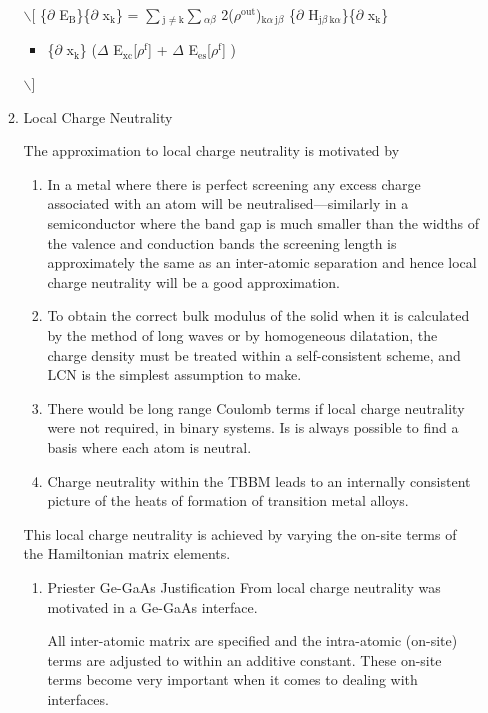 \documentclass[11pt]{article}
\begin{document}
\begin{enumerate}
\begin{enumerate}
$\backslash$[
\frac\{$\partial$ E$_{\text{B}}$\}\{$\partial$ x$_{\text{k}}$\} = 
   $\sum$$_{\text{j }\neq\ \text{k}}$$\sum$$_{\alpha\beta}$ 2($\rho$$^{\text{out}}$)$_{\text{k}\alpha\ \text{j}\beta}$
       \frac\{$\partial$ H$_{\text{j}\beta\ \text{k}\alpha}$\}\{$\partial$ x$_{\text{k}}$\}
\begin{itemize}
\item \frac{\partial}\{$\partial$ x$_{\text{k}}$\} \big($\Delta$ E$_{\text{xc}}$[$\rho$$^{\text{f}}$] + $\Delta$ E$_{\text{es}}$[$\rho$$^{\text{f}}$] \big )
\end{itemize}
$\backslash$]

\item Local Charge Neutrality
\label{sec-1-1-2-2-3}

The approximation to local charge neutrality is motivated by 
\begin{enumerate}
\item In a metal where there is perfect screening any excess charge associated
with an atom will be neutralised---similarly in a semiconductor where the
band gap is much smaller than the widths of the valence and conduction
bands the screening length is approximately the same as an inter-atomic
separation and hence local charge neutrality will be a good
approximation.
\item To obtain the correct bulk modulus of the solid when it is calculated by
the method of long waves or by homogeneous dilatation, the charge density
must be treated within a self-consistent scheme, and LCN is the simplest
assumption to make.
\item There would be long range Coulomb terms if local charge neutrality were
not required, in binary systems. Is is always possible to find a basis
where each atom is neutral.
\item Charge neutrality within the TBBM leads to an internally consistent
picture of the heats of formation of transition metal alloys.
\end{enumerate}

This local charge neutrality is achieved by varying the on-site terms of the
Hamiltonian matrix elements. 

\begin{enumerate}
\item Priester Ge-GaAs Justification
\label{sec-1-1-2-2-3-1}
From \cite{Priester1986} local charge neutrality was motivated in a Ge-GaAs
interface. 

All inter-atomic matrix are specified and the intra-atomic (on-site) terms are
adjusted to within an additive constant. These on-site terms become very
important when it comes to dealing with interfaces. 


\end{enumerate}
\end{enumerate}
\end{enumerate}
\end{document}
